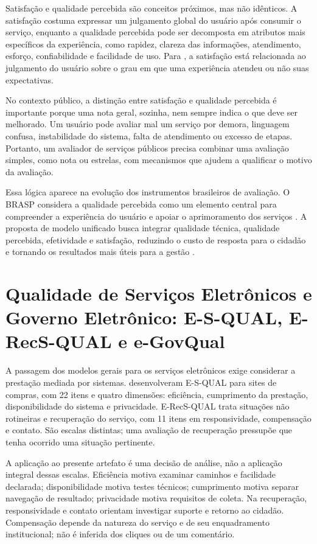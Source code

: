 Satisfação e qualidade percebida são conceitos próximos, mas não idênticos. A satisfação costuma expressar um julgamento global do usuário após consumir o serviço, enquanto a qualidade percebida pode ser decomposta em atributos mais específicos da experiência, como rapidez, clareza das informações, atendimento, esforço, confiabilidade e facilidade de uso. Para , a satisfação está relacionada ao julgamento do usuário sobre o grau em que uma experiência atendeu ou não suas expectativas.

No contexto público, a distinção entre satisfação e qualidade percebida é importante porque uma nota geral, sozinha, nem sempre indica o que deve ser melhorado. Um usuário pode avaliar mal um serviço por demora, linguagem confusa, instabilidade do sistema, falta de atendimento ou excesso de etapas. Portanto, um avaliador de serviços públicos precisa combinar uma avaliação simples, como nota ou estrelas, com mecanismos que ajudem a qualificar o motivo da avaliação.

Essa lógica aparece na evolução dos instrumentos brasileiros de avaliação. O BRASP considera a qualidade percebida como um elemento central para compreender a experiência do usuário e apoiar o aprimoramento dos serviços \cite{silva2019}. A proposta de modelo unificado busca integrar qualidade técnica, qualidade percebida, efetividade e satisfação, reduzindo o custo de resposta para o cidadão e tornando os resultados mais úteis para a gestão \cite{silva2022}.

\section{Qualidade de Serviços Eletrônicos e Governo Eletrônico: E-S-QUAL, E-RecS-QUAL e e-GovQual}
\label{sec:2.4}

A passagem dos modelos gerais para os serviços eletrônicos exige considerar a prestação mediada por sistemas.  desenvolveram E-S-QUAL para sites de compras, com 22 itens e quatro dimensões: eficiência, cumprimento da prestação, disponibilidade do sistema e privacidade. E-RecS-QUAL trata situações não rotineiras e recuperação do serviço, com 11 itens em responsividade, compensação e contato. São escalas distintas; uma avaliação de recuperação pressupõe que tenha ocorrido uma situação pertinente.

A aplicação ao presente artefato é uma decisão de análise, não a aplicação integral dessas escalas. Eficiência motiva examinar caminhos e facilidade declarada; disponibilidade motiva testes técnicos; cumprimento motiva separar navegação de resultado; privacidade motiva requisitos de coleta. Na recuperação, responsividade e contato orientam investigar suporte e retorno ao cidadão. Compensação depende da natureza do serviço e de seu enquadramento institucional; não é inferida dos cliques ou de um comentário.

